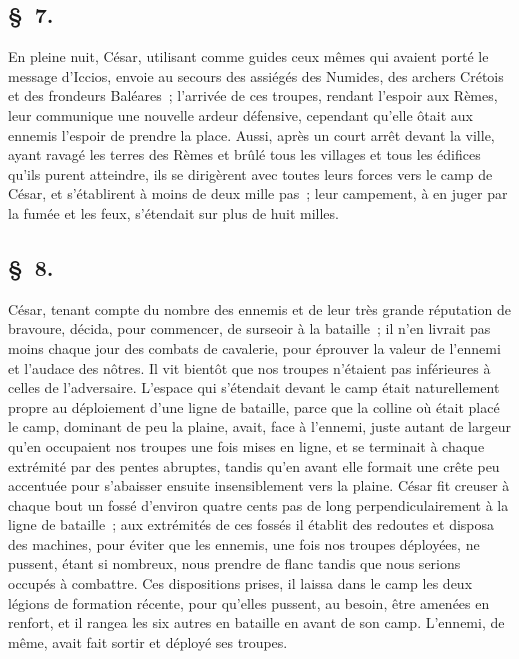 \documentclass[french,twoside]{book} %
\begin{document}
\subsection[{§ 7.}]{ \textsc{§ 7.} }
\noindent En pleine nuit, César, utilisant comme guides ceux mêmes qui avaient porté le message d’Iccios, envoie au secours des assiégés des Numides, des archers Crétois et des frondeurs Baléares ; l’arrivée de ces troupes, rendant l’espoir aux Rèmes, leur communique une nouvelle ardeur défensive, cependant qu’elle ôtait aux ennemis l’espoir de prendre la place. Aussi, après un court arrêt devant la ville, ayant ravagé les terres des Rèmes et brûlé tous les villages et tous les édifices qu’ils purent atteindre, ils se dirigèrent avec toutes leurs forces vers le camp de César, et s’établirent à moins de deux mille pas ; leur campement, à en juger par la fumée et les feux, s’étendait sur plus de huit milles.
\subsection[{§ 8.}]{ \textsc{§ 8.} }
\noindent César, tenant compte du nombre des ennemis et de leur très grande réputation de bravoure, décida, pour commencer, de surseoir à la bataille ; il n’en livrait pas moins chaque jour des combats de cavalerie, pour éprouver la valeur de l’ennemi et l’audace des nôtres. Il vit bientôt que nos troupes n’étaient pas inférieures à celles de l’adversaire. L'espace qui s’étendait devant le camp était naturellement propre au déploiement d’une ligne de bataille, parce que la colline où était placé le camp, dominant de peu la plaine, avait, face à l’ennemi, juste autant de largeur qu’en occupaient nos troupes une fois mises en ligne, et se terminait à chaque extrémité par des pentes abruptes, tandis qu’en avant elle formait une crête peu accentuée pour s’abaisser ensuite insensiblement vers la plaine. César fit creuser à chaque bout un fossé d’environ quatre cents pas de long perpendiculairement à la ligne de bataille ; aux extrémités de ces fossés il établit des redoutes et disposa des machines, pour éviter que les ennemis, une fois nos troupes déployées, ne pussent, étant si nombreux, nous prendre de flanc tandis que nous serions occupés à combattre. Ces dispositions prises, il laissa dans le camp les deux légions de formation récente, pour qu’elles pussent, au besoin, être amenées en renfort, et il rangea les six autres en bataille en avant de son camp. L'ennemi, de même, avait fait sortir et déployé ses troupes.
\end{document}

